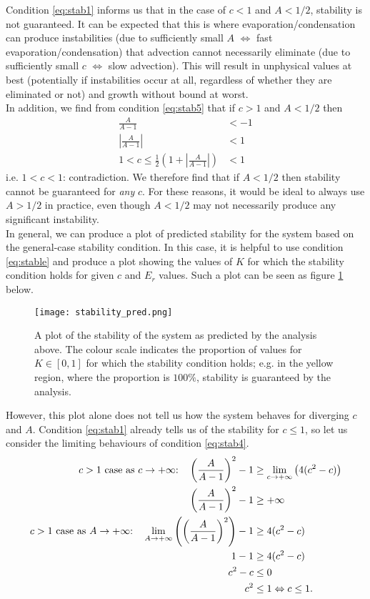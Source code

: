 \documentclass[11pt]{article}
\begin{document}
Condition \ref{eq:stab1} informs us that in the case of $c<1$ and $A<1/2$, stability is not guaranteed. It can be expected that this is where evaporation/condensation can produce instabilities (due to sufficiently small $A$ $\Leftrightarrow$ fast evaporation/condensation) that advection cannot necessarily eliminate (due to sufficiently small $c$ $\Leftrightarrow$ slow advection). This will result in unphysical values at best (potentially if instabilities occur at all, regardless of whether they are eliminated or not) and growth without bound at worst. \\
In addition, we find from condition \ref{eq:stab5} that if $c>1$ and $A<1/2$ then
\begin{align*}
\frac{A}{A-1} &< -1 \\
\left|\frac{A}{A-1}\right| &< 1 \\
1 < c \leq \frac{1}{2}\left(1 + \left|\frac{A}{A-1}\right|\right) &< 1
\end{align*}
i.e. $1<c<1$: contradiction. We therefore find that if $A<1/2$ then stability cannot be guaranteed for \emph{any} $c$. For these reasons, it would be ideal to always use $A>1/2$ in practice, even though $A<1/2$ may not necessarily produce any significant instability. \\
In general, we can produce a plot of predicted stability for the system based on the general-case stability condition. In this case, it is helpful to use condition \ref{eq:stable} and produce a plot showing the values of $K$ for which the stability condition holds for given $c$ and $E_r$ values. Such a plot can be seen as figure \ref{fig:stability_pred} below.
\begin{figure}[H]
\centering
\texttt{[image: stability\_pred.png]}
\caption{A plot of the stability of the system as predicted by the analysis above. The colour scale indicates the proportion of values for $K\in[0,1]$ for which the stability condition holds; e.g. in the yellow region, where the proportion is $100\%$, stability is guaranteed by the analysis.}
\label{fig:stability_pred}
\end{figure}
However, this plot alone does not tell us how the system behaves for diverging $c$ and $A$. Condition \ref{eq:stab1} already tells us of the stability for $c\leq 1$, so let us consider the limiting behaviours of condition \ref{eq:stab4}.
\begin{align}
\text{$c>1$ case as $c\to +\infty$:\quad} \left(\frac{A}{A-1}\right)^2 -1 &\geq \lim_{c\to +\infty}\left(4(c^2-c)\right) \nonumber \\
\left(\frac{A}{A-1}\right)^2 -1 &\geq +\infty		\label{eq:stab2} \\
\text{$c>1$ case as $A\to +\infty$:\quad} \lim_{A\to +\infty}\left(\left(\frac{A}{A-1}\right)^2\right)-1 &\geq 4(c^2-c) \nonumber\\
1 - 1 &\geq 4(c^2-c) \nonumber\\
c^2-c &\leq 0 \nonumber\\
c^2 &\leq 1 \Leftrightarrow
c \leq 1.		\label{eq:stab3}
\end{align}
\end{document}
